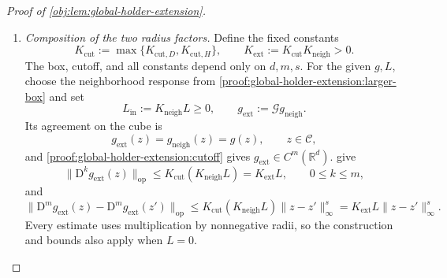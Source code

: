 \begin{proof}[Proof of \cref{obj:lem:global-holder-extension}]
\begin{enumerate}
Now let \(z\in\mathcal B_{\mathrm{ext}}\) and \(z'\notin\mathcal B_{\mathrm{ext}}\). Some coordinate \(i\) satisfies
\(z_i'<\ell_{\mathrm{ext},i}\) or \(z_i'>b_{\mathrm{ext},i}\). Define
\[
(z_{\mathrm{boundary}})_j:=
\begin{cases}
\ell_{\mathrm{ext},i},&j=i,\ z_i'<\ell_{\mathrm{ext},i},\\
b_{\mathrm{ext},i},&j=i,\ z_i'>b_{\mathrm{ext},i},\\
z_j,&j\ne i.
\end{cases}
\]
Then
\[
z_{\mathrm{boundary}}\in
\mathcal B_{\mathrm{ext}}\setminus\mathcal B_{\mathrm{ext}}^\circ,
\qquad
\|z-z_{\mathrm{boundary}}\|_\infty
\le |z_i-z_i'|
\le\|z-z'\|_\infty.
\]
 makes the top derivative zero at both \(z'\) and
\(z_{\mathrm{boundary}}\). Hence
\[
\begin{aligned}
&\|\mathrm D^m\mathscr G g_{\mathrm{in}}(z)
-\mathrm D^m\mathscr G g_{\mathrm{in}}(z')\|_{\mathrm{op}}\\
&\quad=
\|\mathrm D^m\mathscr G g_{\mathrm{in}}(z)
-\mathrm D^m\mathscr G g_{\mathrm{in}}(z_{\mathrm{boundary}})\|_{\mathrm{op}}\\
&\quad\le
K_{\mathrm{cut},H}L_{\mathrm{in}}
\|z-z_{\mathrm{boundary}}\|_\infty^s
\le K_{\mathrm{cut},H}L_{\mathrm{in}}\|z-z'\|_\infty^s.
\end{aligned}
\]
Reversing the points treats the opposite crossing order. If both points lie outside the closed box, both derivatives are zero. Together with the closed-box estimate, these cases establish the displayed modulus for all \(z,z'\in\mathbb R^d\). In dimension zero the outside cases are empty.

\item \emph{Composition of the two radius factors.}
Define the fixed constants
\[
K_{\mathrm{cut}}:=\max\{K_{\mathrm{cut},D},K_{\mathrm{cut},H}\},
\qquad
K_{\mathrm{ext}}:=K_{\mathrm{cut}}K_{\mathrm{neigh}}>0.
\]
The box, cutoff, and all constants depend only on \(d,m,s\). For the given \(g,L\), choose the neighborhood response from \cref{proof:global-holder-extension:larger-box} and set
\[
L_{\mathrm{in}}:=K_{\mathrm{neigh}}L\ge0,
\qquad
g_{\mathrm{ext}}:=\mathscr G g_{\mathrm{neigh}}.
\]
Its agreement on the cube is
\[
g_{\mathrm{ext}}(z)=g_{\mathrm{neigh}}(z)=g(z),
\qquad z\in\mathcal C,
\]
and \cref{proof:global-holder-extension:cutoff} gives \(g_{\mathrm{ext}}\in C^m(\mathbb R^d)\).  give
\[
\|\mathrm D^k g_{\mathrm{ext}}(z)\|_{\mathrm{op}}
\le K_{\mathrm{cut}}(K_{\mathrm{neigh}}L)
=K_{\mathrm{ext}}L,
\qquad 0\le k\le m,
\]
and
\[
\|\mathrm D^m g_{\mathrm{ext}}(z)-\mathrm D^m g_{\mathrm{ext}}(z')\|_{\mathrm{op}}
\le K_{\mathrm{cut}}(K_{\mathrm{neigh}}L)\|z-z'\|_\infty^s
=K_{\mathrm{ext}}L\|z-z'\|_\infty^s.
\]
Every estimate uses multiplication by nonnegative radii, so the construction and bounds also apply when \(L=0\).
\end{enumerate}
\end{proof}

